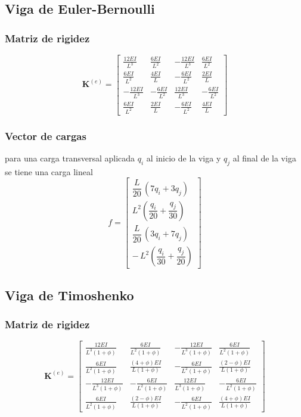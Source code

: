 \subsection{Viga de Euler-Bernoulli}
\subsubsection{Matriz de rigidez}
\begin{equation}
    \mathbf{K}^{(e)} = 
    \begin{bmatrix}
    \frac{12EI}{L^3}&\frac{6EI}{L^2}&-\frac{12EI}{L^3}&\frac{6EI}{L^2}\\[8pt]
    \frac{6EI}{L^2}&\frac{4EI}{L}&-\frac{6EI}{L^2}&\frac{2EI}{L}\\[8pt]
    -\frac{12EI}{L^3}&-\frac{6EI}{L^2}&\frac{12EI}{L^3}&-\frac{6EI}{L^2}\\[8pt]
    \frac{6EI}{L^2}&\frac{2EI}{L}&-\frac{6EI}{L^2}&\frac{4EI}{L}
    \end{bmatrix}
\end{equation}
\subsubsection{Vector de cargas}
para una carga transversal aplicada $q_i$ al inicio de la viga y $q_j$ al final de la viga se tiene una carga lineal
\[
f =
\begin{bmatrix}
\dfrac{L}{20}\,(7q_i + 3q_j) \\[8pt]
L^{2}\left(\dfrac{q_i}{20} + \dfrac{q_j}{30}\right) \\[8pt]
\dfrac{L}{20}\,(3q_i + 7q_j) \\[8pt]
-\,L^{2}\left(\dfrac{q_i}{30} + \dfrac{q_j}{20}\right)
\end{bmatrix}
\]

\subsection{Viga de Timoshenko}
\subsubsection{Matriz de rigidez}
\begin{equation}
    \mathbf{K}^{(e)} = 
    \begin{bmatrix}
    \frac{12EI}{L^3(1+\phi)} & \frac{6EI}{L^2(1+\phi)} & -\frac{12EI}{L^3(1+\phi)} & \frac{6EI}{L^2(1+\phi)} \\[8pt]
    \frac{6EI}{L^2(1+\phi)} & \frac{(4+\phi)EI}{L(1+\phi)} & -\frac{6EI}{L^2(1+\phi)} & \frac{(2-\phi)EI}{L(1+\phi)} \\[8pt]
    -\frac{12EI}{L^3(1+\phi)} & -\frac{6EI}{L^2(1+\phi)} & \frac{12EI}{L^3(1+\phi)} & -\frac{6EI}{L^2(1+\phi)} \\[8pt]
    \frac{6EI}{L^2(1+\phi)} & \frac{(2-\phi)EI}{L(1+\phi)} & -\frac{6EI}{L^2(1+\phi)} & \frac{(4+\phi)EI}{L(1+\phi)}
    \end{bmatrix}
\end{equation}

